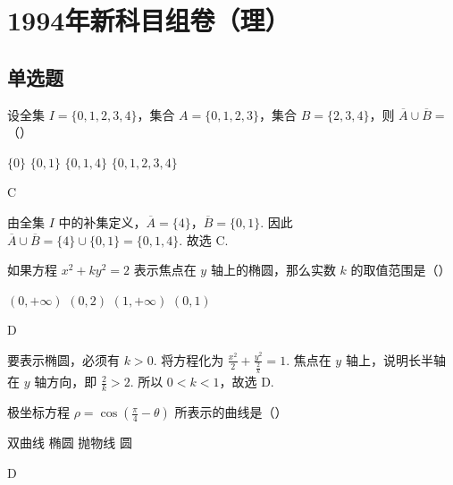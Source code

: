 \chapter{1994年新科目组卷（理）}
\section{单选题}

\begin{problem}
设全集 \(I = \{0, 1, 2, 3, 4\}\)，集合 \(A = \{0, 1, 2, 3\}\)，集合 \(B = \{2, 3, 4\}\)，则 \(\overline{A} \cup \overline{B} =\)（\quad）

\choices
    {\(\{0\}\)}
    {\(\{0,1\}\)}
    {\(\{0,1,4\}\)}
    {\(\{0,1,2,3,4\}\)}
\end{problem}

\begin{answer}
C
\end{answer}

\begin{solution}
由全集 \(I\) 中的补集定义，\(\overline{A}=\{4\}\)，\(\overline{B}=\{0,1\}\). 因此 \(\overline{A}\cup\overline{B}=\{4\}\cup\{0,1\}=\{0,1,4\}\).
故选 C.
\end{solution}

\begin{problem}
如果方程 \(x^{2} + ky^{2} = 2\) 表示焦点在 \(y\) 轴上的椭圆，那么实数 \(k\) 的取值范围是（\quad）

\choices
    {\((0, +\infty)\)}
    {\((0, 2)\)}
    {\((1, +\infty)\)}
    {\((0, 1)\)}
\end{problem}

\begin{answer}
D
\end{answer}

\begin{solution}
要表示椭圆，必须有 \(k>0\). 将方程化为 \(\frac{x^2}{2}+\frac{y^2}{\frac{2}{k}}=1\). 焦点在 \(y\) 轴上，说明长半轴在 \(y\) 轴方向，即 \(\frac{2}{k}>2\).
所以 \(0<k<1\)，故选 D.
\end{solution}

\begin{problem}
极坐标方程 \(\rho = \cos \left(\frac{\pi}{4} -\theta\right)\) 所表示的曲线是（\quad）

\choices
    {双曲线}
    {椭圆}
    {抛物线}
    {圆}
\end{problem}

\begin{answer}
D
\end{answer}

